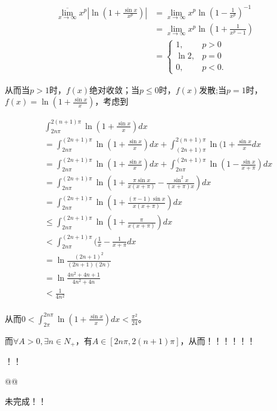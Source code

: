 \begin{solution}
\begin{align*}
  \overline{\lim_{x\rightarrow\infty}}x^p|\ln(1+\frac{\sin x}{x^p})|
  &=\lim_{x\rightarrow\infty}x^p\ln(1-\frac{1}{x^p})^{-1}\\
  &=\lim_{x\rightarrow\infty}x^p\ln(1+\frac{1}{x^p-1})\\
  &=\left\{\begin{array}{ll}1,&p>0\\\ln2,&p=0\\0,&p<0.\end{array}\right.  
  \end{align*}

  从而当$p>1$时，$f(x)$绝对收敛；当$p\leq0$时，$f(x)$发散;当$p=1$时，$f(x)=\ln(1+\frac{\sin x}{x})$，考虑到

  \begin{align*}
  &\int_{2n\pi}^{2(n+1)\pi}\ln(1+\frac{\sin x}{x})dx\\&=\int_{2n\pi}^{(2n+1)\pi}\ln(1+\frac{\sin x}{x})dx+\int_{(2n+1)\pi}^{2(n+1)\pi}\ln(1+\frac{\sin x}{x}dx\\
  &=\int_{2n\pi}^{(2n+1)\pi}\ln(1+\frac{\sin x}{x})dx+\int_{2n\pi}^{(2n+1)\pi}\ln(1-\frac{\sin x}{x+\pi})dx\\
  &=\int_{2n\pi}^{(2n+1)\pi}\ln(1+\frac{\pi\sin x}{x(x+\pi)}-\frac{\sin^2x}{(x+\pi)x})dx\\
  &=\int_{2n\pi}^{(2n+1)\pi}\ln(1+\frac{(\pi-1)\sin x}{x(x+\pi)})dx\\
  &\leq\int_{2n\pi}^{(2n+1)\pi}\ln(1+\frac{\pi}{x(x+\pi)})dx\\
  &<\int_{2n\pi}^{(2n+1)\pi}(\frac{1}{x}-\frac{1}{x+\pi}dx\\
  &=\ln\frac{(2n+1)^2}{(2n+1)(2n)}\\
  &=\ln\frac{4n^2+4n+1}{4n^2+4n}\\
  &<\frac{1}{4n^2}\\
  \end{align*}

  
  从而$0<\int_{2\pi}^{2n\pi}\ln(1+\frac{\sin x}{x})dx<\frac{\pi^2}{24}$。
  
  而$\forall A>0,\exists n\in N_+$，有$A\in[2n\pi,2(n+1)\pi]$，从而！！！！！！
  
  
  
  ！！
  
  @@
  
  未完成！！
    
\end{solution}  
    
